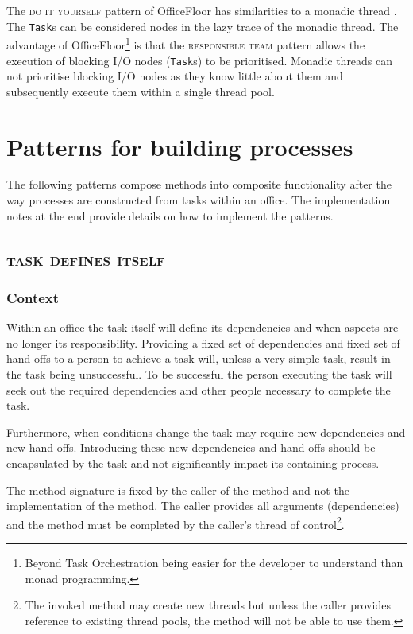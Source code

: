 \documentclass[prodmode]{style/acmlarge}
\begin{document}
The \textsc{do it yourself} pattern of OfficeFloor has similarities to a monadic
thread \cite{monadic-thread}.  The \texttt{Task}s can be considered nodes in the
lazy trace of the monadic thread.  The advantage of OfficeFloor\footnote{Beyond
Task Orchestration being easier for the developer to understand than monad
programming.} is that the \textsc{responsible team} pattern allows the execution
of blocking I/O nodes (\texttt{Task}s) to be prioritised.  Monadic threads can
not prioritise blocking I/O nodes as they know little about them and
subsequently execute them within a single thread pool.




\section{Patterns for building processes}

The following patterns compose methods into composite functionality after the
way processes are constructed from tasks within an office.  The implementation
notes at the end provide details on how to implement the patterns.


\subsection{\textsc{\textbf{task defines itself}}}

\subsubsection*{Context} Within an office the task itself will define its
dependencies and when aspects are no longer its responsibility.  Providing a
fixed set of dependencies and fixed set of hand-offs to a person to achieve a
task will, unless a very simple task, result in the task being unsuccessful.  To
be successful the person executing the task will seek out the required
dependencies and other people necessary to complete the task.

Furthermore, when conditions change the task may require new dependencies and
new hand-offs.  Introducing these new dependencies and hand-offs should be
encapsulated by the task and not significantly impact its containing process.

The method signature is fixed by the caller of the method and not the
implementation of the method.  The caller provides all arguments (dependencies)
and the method must be completed by the caller's thread of
control\footnote{The invoked method may create new threads but unless the caller
provides reference to existing thread pools, the method will not be able to use
them.}.
\end{document}
